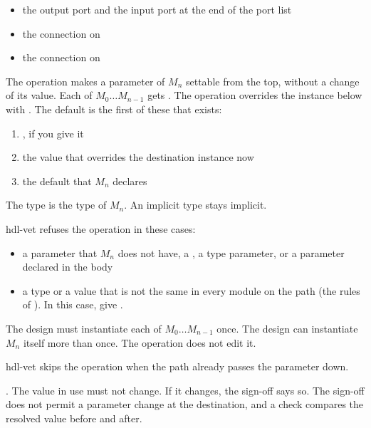 \begin{itemize}
\item the output port  and the input port  at the end of
  the port list
\item the connection  on 
\item the connection  on 
\end{itemize}

\begin{entry}{}
\item[Writes] The operation makes a parameter of $M_n$ settable from the top, without a
  change of its value. Each of $M_0\ldots M_{n-1}$ gets
  . The operation overrides the instance below with
  . The default is the first of these that exists:
  \begin{enumerate}
  \item {}, if you give it
  \item the value that overrides the destination instance now
  \item the default that $M_n$ declares
  \end{enumerate}
  The type is the type of $M_n$. An implicit type stays implicit.
\item[Refused] hdl-vet refuses the operation in these cases:
  \begin{itemize}
  \item a parameter that $M_n$ does not have, a , a type
    parameter, or a parameter declared in the body
  \item a type or a value that is not the same in every module on the path (the rules of
    ). In this case, give .
  \end{itemize}
  The design must instantiate each of $M_0\ldots M_{n-1}$ once. The design can
  instantiate $M_n$ itself more than once. The operation does not edit it.
\item[Again] hdl-vet skips the operation when the path already passes the parameter down.
\item[Example] . The value in use must not change. If it changes,
  the sign-off says so. The sign-off does not permit a parameter change at the
  destination, and a check compares the resolved value before and after.
\end{entry}

